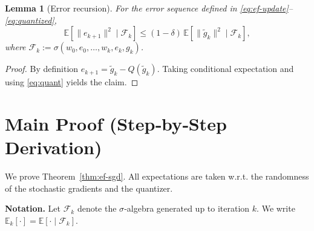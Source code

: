 \documentclass{article}
\newtheorem{lemma}{Lemma}
\newcommand{\E}{\mathbb{E}}
\begin{document}
\begin{lemma}[Error recursion]
\label{lem:error}
For the error sequence defined in \eqref{eq:ef-update}–\eqref{eq:quantized},
\[
\E\!\left[\|e_{k+1}\|^{2}\mid \mathcal F_k\right]
\le (1-\delta)\,\E\!\left[\|\tilde g_k\|^{2}\mid \mathcal F_k\right],
\]
where $\mathcal F_k:=\sigma(w_0,e_0,\dots,w_k,e_k,g_k)$.
\end{lemma}
\begin{proof}
By definition $e_{k+1}= \tilde g_k - Q(\tilde g_k)$.
Taking conditional expectation and using \eqref{eq:quant} yields the claim.
\end{proof}

\section*{Main Proof (Step‑by‑Step Derivation)}
We prove Theorem~\ref{thm:ef-sgd}.  All expectations are taken w.r.t.
the randomness of the stochastic gradients and the quantizer.

\noindent\textbf{Notation.}
Let $\mathcal F_k$ denote the $\sigma$‑algebra generated up to iteration $k$.
We write $\E_k[\cdot]=\E[\cdot\mid\mathcal F_k]$.
\end{document}

